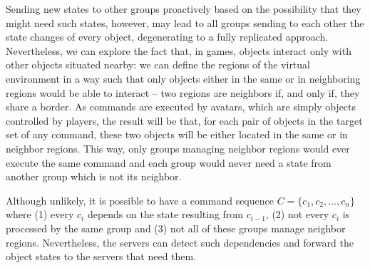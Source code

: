 \documentclass[]{usiinfprospectus}
\begin{document}
Sending new states to other groups proactively based on the possibility that they might need such states, however, may lead to all groups sending to each other the state changes of every object, degenerating to a fully replicated approach. Nevertheless, we can explore the fact that, in games, objects interact only with other objects situated nearby: we can define the regions of the virtual environment in a way such that only objects either in the same or in neighboring regions would be able to interact -- two regions are neighbors if, and only if, they share a border. As commands are executed by avatars, which are simply objects controlled by players, the result will be that, for each pair of objects in the target set of any command, these two objects will be either located in the same or in neighbor regions. This way, only groups managing neighbor regions would ever execute the same command and each group would never need a state from another group which is not its neighbor.

Although unlikely, it is possible to have a command sequence $C = \{c_1,c_2,\ldots,c_n\}$ where (1) every $c_i$ depends on the state resulting from $c_{i-1}$, (2) not every $c_i$ is processed by the same group and (3) not all of these groups manage neighbor regions. Nevertheless, the servers can detect such dependencies and forward the object states to the servers that need them.%


% 

\end{document}
